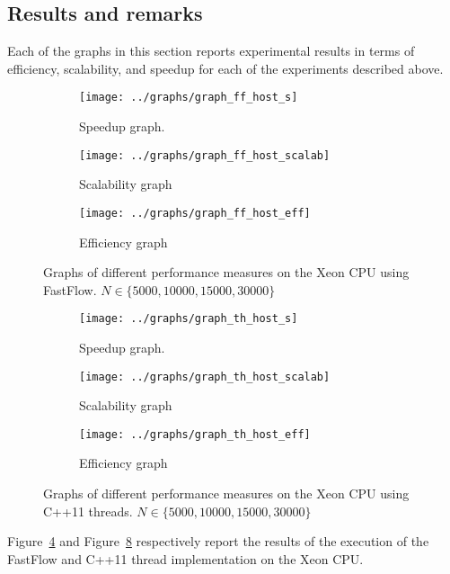 \subsection{Results and remarks} \label{subsec:results}
Each of the graphs in this section reports experimental results in terms of efficiency, scalability, and speedup for each of the experiments described above.
\begin{figure}[h]
	\centering
	\begin{subfigure}[b]{0.3\linewidth}
		\texttt{[image: ../graphs/graph\_ff\_host\_s]}
		\caption{Speedup graph.}
		\label{fig:ff_host_s}
	\end{subfigure}
	\begin{subfigure}[b]{0.3\linewidth}
		\texttt{[image: ../graphs/graph\_ff\_host\_scalab]}
		\caption{Scalability graph}
		\label{fig:ff_host_scalab}
	\end{subfigure}
	\begin{subfigure}[b]{0.3\linewidth}
		\texttt{[image: ../graphs/graph\_ff\_host\_eff]}
		\caption{Efficiency graph}
		\label{fig:ff_host_eff}
	\end{subfigure}
	\caption{Graphs of different performance measures on the Xeon CPU using FastFlow. $N \in \{ 5000, 10000, 15000, 30000\}$}
	\label{fig:ff_host}
\end{figure}
\begin{figure}[h]
	\centering
	\begin{subfigure}[b]{0.3\textwidth}
		\texttt{[image: ../graphs/graph\_th\_host\_s]}
		\caption{Speedup graph.}
		\label{fig:th_host_s}
	\end{subfigure}
	\begin{subfigure}[b]{0.3\textwidth}
		\texttt{[image: ../graphs/graph\_th\_host\_scalab]}
		\caption{Scalability graph}
		\label{fig:th_host_scalab}
	\end{subfigure}
	\begin{subfigure}[b]{0.3\textwidth}
		\texttt{[image: ../graphs/graph\_th\_host\_eff]}
		\caption{Efficiency graph}
		\label{fig:th_host_eff}
	\end{subfigure}
	\caption{Graphs of different performance measures on the Xeon CPU using C++11 threads. $N \in \{ 5000, 10000, 15000, 30000\}$}
	\label{fig:th_host}
\end{figure}
Figure~\ref{fig:ff_host} and Figure~\ref{fig:th_host} respectively report the results of the execution of the FastFlow and C++11 thread implementation on the Xeon CPU.
